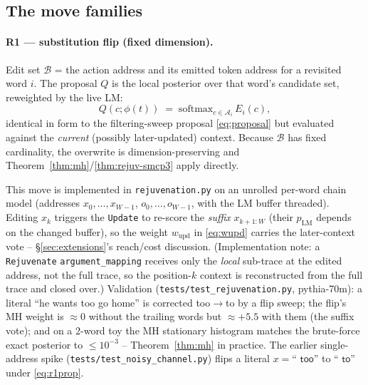 \documentclass[11pt]{article}
\newcommand{\pLM}{p_{\mathrm{LM}}}
\newcommand{\code}[1]{\texttt{#1}}
\begin{document}
\subsection{The move families}
\label{sec:moves}

\paragraph{R1 — substitution flip (fixed dimension).} Edit set $\mathcal B$ = the action address and
its emitted token address for a revisited word $i$. The proposal $Q$ is the local posterior over that
word's candidate set, reweighted by the live LM:
\begin{equation}\label{eq:r1prop}
  Q(c;\phi(t)) \;=\; \mathrm{softmax}_{c\in\mathcal A_i}\, E_i(c),
\end{equation}
identical in form to the filtering-sweep proposal \eqref{eq:proposal} but evaluated against the
\emph{current} (possibly later-updated) context. Because $\mathcal B$ has fixed cardinality, the
overwrite is dimension-preserving and Theorem~\ref{thm:mh}/\ref{thm:rejuv-smcp3} apply directly.

This move is implemented in \code{rejuvenation.py} on an unrolled per-word chain model (addresses
$x_0,\dots,x_{W-1}$, $o_0,\dots,o_{W-1}$, with the LM buffer threaded). Editing $x_k$ triggers the
\code{Update} to re-score the \emph{suffix} $x_{k+1{:}W}$ (their $\pLM$ depends on the changed
buffer), so the weight $w_{\mathrm{upd}}$ in \eqref{eq:wupd} carries the later-context vote --
\S\ref{sec:extensions}'s reach/cost discussion. (Implementation note: a \code{Rejuvenate}
\code{argument\_mapping} receives only the \emph{local} sub-trace at the edited address, not the
full trace, so the position-$k$ context is reconstructed from the full trace and closed over.)
Validation (\code{tests/test\_rejuvenation.py}, pythia-70m): a literal ``he wants \textsf{too} go
home'' is corrected \textsf{too}$\to$\textsf{to} by a flip sweep; the flip's MH weight is $\approx 0$
without the trailing words but $\approx +5.5$ with them (the suffix vote); and on a 2-word toy the MH
stationary histogram matches the brute-force exact posterior to $\le 10^{-3}$ -- Theorem~\ref{thm:mh}
in practice. The earlier single-address spike (\code{tests/test\_noisy\_channel.py}) flips a literal
$x=\textsf{`` too''}$ to $\textsf{`` to''}$ under \eqref{eq:r1prop}.
\end{document}
